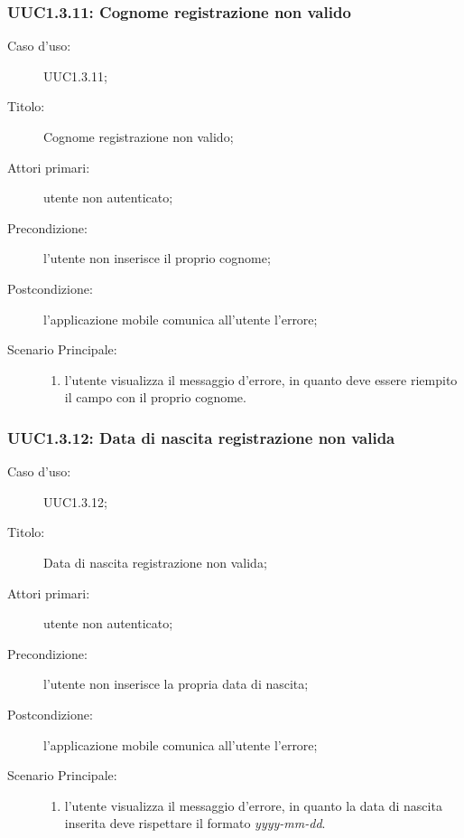 \documentclass[../../../analisi-dei-requisiti.tex]{subfiles}
\begin{document}
\subsubsection{UUC1.3.11: Cognome registrazione non valido}%
\label{subs:UUC1.3.11}
\begin{description}
  \item[Caso d'uso:] UUC1.3.11;
  \item[Titolo:] Cognome registrazione non valido;
  \item[Attori primari:] utente non autenticato;
  \item[Precondizione:] l'utente non inserisce il proprio cognome;
  \item[Postcondizione:] l'applicazione mobile comunica all'utente l'errore;
  \item[Scenario Principale:]
        \begin{enumerate}
          \item l'utente visualizza il messaggio d'errore, in quanto deve essere riempito il campo con il proprio cognome.
        \end{enumerate}
\end{description}

\subsubsection{UUC1.3.12: Data di nascita registrazione non valida}%
\label{subs:UUC1.3.12}
\begin{description}
  \item[Caso d'uso:] UUC1.3.12;
  \item[Titolo:] Data di nascita registrazione non valida;
  \item[Attori primari:] utente non autenticato;
  \item[Precondizione:] l'utente non inserisce la propria data di nascita;
  \item[Postcondizione:] l'applicazione mobile comunica all'utente l'errore;
  \item[Scenario Principale:]
        \begin{enumerate}
          \item l'utente visualizza il messaggio d'errore, in quanto la data di nascita inserita deve rispettare il formato \textit{yyyy-mm-dd}.
        \end{enumerate}
\end{description}
\end{document}
